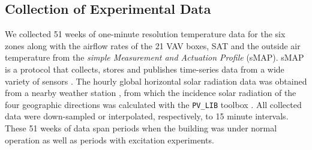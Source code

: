 

\subsection{Collection of Experimental Data}\label{sec:exp_data}
We collected 51 weeks of one-minute resolution temperature data for the six zones along with the airflow rates of the 21 VAV boxes, SAT and the outside air temperature from the \textit{simple Measurement and Actuation Profile} (sMAP). sMAP is a protocol that collects, stores and publishes time-series data from a wide variety of sensors \cite{smap, Dawson-Haggerty:2012aa}. The hourly global horizontal solar radiation data was obtained from a nearby weather station \cite{SolarRad}, from which the incidence solar radiation of the four geographic directions was calculated with the \texttt{PV\_LIB} toolbox \cite{pv_model}. All collected data were down-sampled or interpolated, respectively, to 15 minute intervals. 
These 51 weeks of data span periods when the building was under normal operation as well as periods with excitation experiments. 

